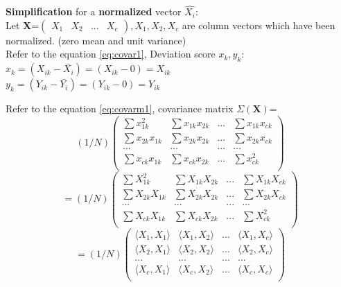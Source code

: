 \documentclass[a4paper,12pt]{article}
\begin{document}
\begin{compactitem}
\item \textbf{Simplification} for a \textbf{normalized} vector $\hat{X_i}$:\\
Let \textbf{X}=$\begin{pmatrix} X_1 & X_2 & ... & X_c \end{pmatrix}, X_1,X_2,X_c$ are column vectors which have been normalized.
(zero mean and unit variance)\\

Refer to the equation \eqref{eq:covar1}, Deviation score $x_k, y_k$:\\
$x_{k}=(X_{ik}-\bar{X_i})=(X_{ik} - 0)= X_{ik}$ \\
$y_{k}=(Y_{ik}-\bar{Y_i})=(Y_{ik} - 0) = Y_{ik}$


Refer to the equation \eqref{eq:covarm1}, covariance matrix $\Sigma(\textbf{X})$=
\[
(1/N)
\begin{pmatrix}
       \sum x_{1k}^{2} 	& \sum x_{1k} x_{2k} 	& ...	& \sum x_{1k} x_{ck}	\\[0.3em]
       \sum x_{2k} x_{1k} 	& \sum x_{2k} x_{2k} 	& ...	& \sum x_{2k} x_{ck}	\\[0.3em]
       ...		& ...			& ...	&	...		\\[0.3em]
       \sum x_{ck} x_{1k} 	& \sum x_{ck} x_{2k} 	& ...	& \sum x_{ck}^{2}	\\[0.3em]
\end{pmatrix}
\]
\[
=(1/N)
\begin{pmatrix}
       \sum X_{1k}^{2} 	& \sum X_{1k} X_{2k} 	& ...	& \sum X_{1k} X_{ck}	\\[0.3em]
       \sum X_{2k} X_{1k} 	& \sum X_{2k} X_{2k} 	& ...	& \sum X_{2k} X_{ck}	\\[0.3em]
       ...		& ...			& ...	&	...		\\[0.3em]
       \sum X_{ck} X_{1k} 	& \sum X_{ck} X_{2k} 	& ...	& \sum X_{ck}^{2}	\\[0.3em]
\end{pmatrix}
\]
\[
=(1/N)
\begin{pmatrix}
       \langle X_1, X_1 \rangle	& \langle X_1, X_2 \rangle 	& ...	& \langle X_1, X_c	\rangle \\[0.3em]
       \langle X_2, X_1 \rangle 	& \langle X_2, X_2 \rangle	& ...	& \langle X_2, X_c	\rangle \\[0.3em]
       ...		& ...			& ...	&	...		\\[0.3em]
       \langle X_c, X_1 \rangle	& \langle X_c, X_2 \rangle 	& ...	& \langle X_c, X_c\rangle	\\[0.3em]
\end{pmatrix}
\]
\end{compactitem}
\end{document}
